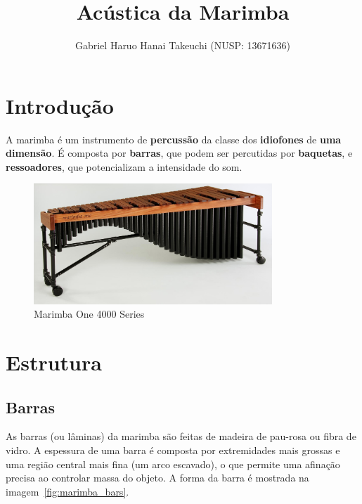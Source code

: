 \documentclass{article}
\title{Acústica da Marimba}
\author{Gabriel Haruo Hanai Takeuchi (NUSP: 13671636)}
\date{}
\begin{document}
\maketitle

\section{Introdução}

A marimba é um instrumento de \textbf{percussão} da classe dos \textbf{idiofones} de \textbf{uma dimensão}. É composta por \textbf{barras}, que podem ser percutidas por \textbf{baquetas}, e \textbf{ressoadores}, que potencializam a intensidade do som.

\begin{figure}[h!]
  \centering
  \includegraphics[width=0.8\textwidth]{Marimba_One_4000_Series.jpg}
  \caption{Marimba One 4000 Series~\cite{wiki:marimba}}
  \noindent 
\end{figure}

\section{Estrutura}

\subsection{Barras}

As barras (ou lâminas) da marimba são feitas de madeira de pau-rosa ou fibra de vidro. A espessura de uma barra é composta por extremidades mais grossas e uma região central mais fina (um arco escavado), o que permite uma afinação precisa ao controlar massa do objeto. A forma da barra é mostrada na imagem~\ref{fig:marimba_bars}.
\end{document}
